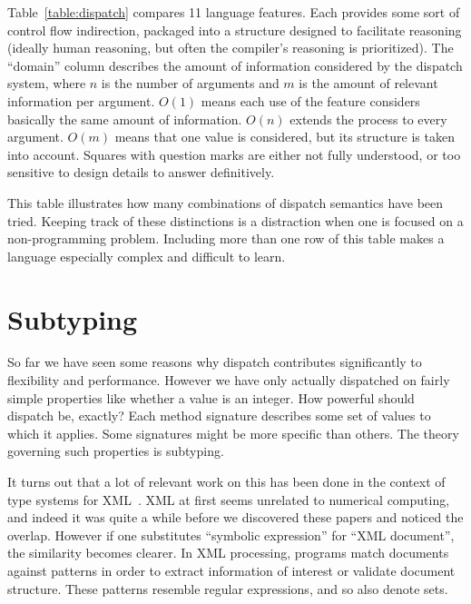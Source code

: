 Table~\ref{table:dispatch} compares 11 language features.
Each provides some sort of control flow indirection, packaged into a
structure designed to facilitate reasoning (ideally human reasoning,
but often the compiler's reasoning is prioritized).
The ``domain'' column describes the amount of information considered
by the dispatch system, where $n$ is the number of arguments and
$m$ is the amount of relevant information per argument.
$O(1)$ means each use of the feature considers basically the same
amount of information.
$O(n)$ extends the process to every argument.
$O(m)$ means that one value is considered, but its structure is
taken into account.
Squares with question marks are either not fully understood, or too
sensitive to design details to answer definitively.


This table illustrates how many combinations of dispatch semantics have
been tried.
Keeping track of these distinctions is a distraction when one is focused
on a non-programming problem.
Including more than one row of this table makes a language especially
complex and difficult to learn.



\section{Subtyping}
\label{sec:chap3subtyping}

So far we have seen some reasons why dispatch contributes significantly
to flexibility and performance.
However we have only actually dispatched on fairly simple properties like
whether a value is an integer.
How powerful should dispatch be, exactly?
Each method signature describes some set of values to which it applies.
Some signatures might be more specific than others.
The theory governing such properties is subtyping.



It turns out that a lot of relevant work on this has been done in the
context of type systems for XML~\cite{hosoya2000xduce, BCF03}.
XML at first seems unrelated to numerical computing, and indeed it
was quite a while before we discovered these papers and noticed the
overlap.
However if one substitutes ``symbolic expression'' for ``XML document'',
the similarity becomes clearer.
In XML processing, programs match documents against patterns in order
to extract information of interest or validate document structure.
These patterns resemble regular expressions, and so also denote sets.

